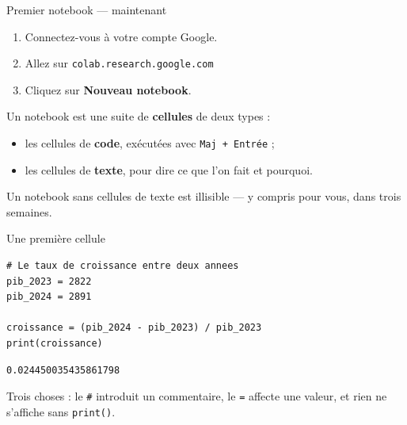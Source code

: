 \documentclass[10pt,aspectratio=169]{beamer}
\begin{document}
\begin{frame}{Premier notebook --- maintenant}
\begin{enumerate}
  \item Connectez-vous à votre compte Google.
  \item Allez sur \texttt{colab.research.google.com}
  \item Cliquez sur \textbf{Nouveau notebook}.
\end{enumerate}

\vspace{1.5em}
Un notebook est une suite de \textbf{cellules} de deux types :

\vspace{0.6em}
\begin{itemize}
  \item les cellules de \textbf{code}, exécutées avec \texttt{Maj + Entrée} ;
  \item les cellules de \textbf{texte}, pour dire ce que l'on fait et pourquoi.
\end{itemize}

\vspace{1.2em}
Un notebook sans cellules de texte est illisible --- y compris pour vous, dans trois semaines.
\end{frame}

\begin{frame}[fragile]{Une première cellule}
\begin{lstlisting}
# Le taux de croissance entre deux annees
pib_2023 = 2822
pib_2024 = 2891

croissance = (pib_2024 - pib_2023) / pib_2023
print(croissance)
\end{lstlisting}

\vspace{0.5em}
\begin{lstlisting}
0.024450035435861798
\end{lstlisting}

\vspace{1em}
Trois choses : le \texttt{\#} introduit un commentaire, le \texttt{=} affecte une valeur, et rien ne s'affiche sans \texttt{print()}.
\end{frame}
\end{document}
